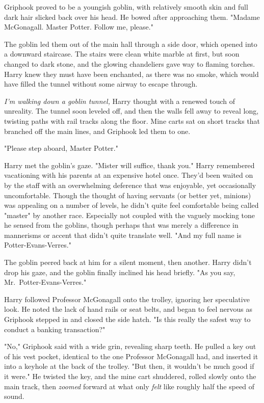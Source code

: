 Griphook proved to be a youngish goblin, with relatively
smooth skin and full dark hair slicked back over his head.
He bowed after approaching them. "Madame McGonagall.
Master Potter. Follow me, please."

The goblin led them out of the main hall through a side
door, which opened into a downward staircase. The stairs
were clean white marble at first, but soon changed to dark
stone, and the glowing chandeliers gave way to flaming
torches. Harry knew they must have been enchanted, as
there was no smoke, which would have filled the tunnel
without some airway to escape through.

\emph{I'm walking down a goblin tunnel,} Harry thought with a
renewed touch of unreality. The tunnel soon leveled off,
and then the walls fell away to reveal long, twisting paths
with rail tracks along the floor. Mine carts sat on short
tracks that branched off the main lines, and Griphook led
them to one.

"Please step aboard, Master Potter."

Harry met the goblin's gaze. "Mister will suffice, thank
you." Harry remembered vacationing with his parents at an
expensive hotel once. They'd been waited on by the staff
with an overwhelming deference that was enjoyable, yet
occasionally uncomfortable. Though the thought of
having servants (or better yet, minions) was appealing on
a number of levels, he didn't quite feel comfortable being
called "master" by another race. Especially not coupled with
the vaguely mocking tone he sensed from the goblins,
though perhaps that was merely a difference in
mannerisms or accent that didn't quite translate well. "And
my full name is Potter-Evans-Verres."

The goblin peered back at him for a silent moment, then
another. Harry didn't drop his gaze, and the goblin finally
inclined his head briefly. "As you say, Mr.~Potter-Evans-Verres."

Harry followed Professor McGonagall onto the trolley,
ignoring her speculative look. He noted the lack of hand
rails or seat belts, and began to feel nervous as Griphook
stepped in and closed the side hatch. "Is this really the
safest way to conduct a banking transaction?"

"No," Griphook said with a wide grin, revealing sharp teeth.
He pulled a key out of his vest pocket, identical to the
one Professor McGonagall had, and inserted it into a
keyhole at the back of the trolley. "But then, it wouldn't
be much good if it were." He twisted the key, and the
mine cart shuddered, rolled slowly onto the main track,
then \emph{zoomed} forward at what only \emph{felt} like roughly half
the speed of sound.

